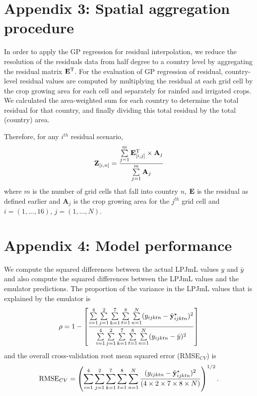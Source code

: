 \section*{Appendix 3: Spatial aggregation procedure}\label{spap}
 In order to apply the GP regression for residual interpolation, we reduce the resolution of the residuals data from half degree to a country level by aggregating the residual matrix ${\bf E}^{\rm T}$. For the evaluation of GP regression of residual, country-level residual values are computed by multiplying the residual at each grid cell by the crop growing area for each cell and separately for rainfed and irrigated crops. We calculated the area-weighted sum for each country to determine the total residual for that country, and finally dividing this total residual by the total (country) area. %

Therefore, for any $i^{th}$ residual scenario, 
\begin{equation}\label{agg1}
\mathbf{Z}_{[i,n]}=\frac{\sum \limits_{j=1}^{m} {\bf E}^{\rm T}_{[i,j]}\times \mathbf{A}_j }{\sum \limits_{j=1}^{m} \mathbf{A}_{j}}
\end{equation} 
where $m$ is the number of grid cells that fall into country $n$, ${\bf E}$ is the residual as defined earlier and $\mathbf{A}_j$ is the crop growing area for the $j^{th}$ grid cell and $i=(1,\ldots,16)$, $j=(1,\ldots,N)$. %

\section*{Appendix 4: Model performance}
We compute the squared differences between the actual LPJmL values $y$ and $\bar y$ and also compute the squared differences between the LPJmL values and the emulator predictions. The proportion of the variance in the LPJmL values that is explained by the emulator is
\begin{align}\label{gaga4}
\rho=1-\left[\frac{\sum\limits_{i=1}^{4}\sum\limits_{j=1}^{2}
\sum\limits_{k=1}^7\sum\limits_{t=1}^8\sum\limits_{n=1}^N
(y_{ijktn}-{\tilde {\bf y}}_{ijktn}^{\star})^2}
{\sum\limits_{i=1}^{4}\sum\limits_{j=1}^{2}
\sum\limits_{k=1}^7\sum\limits_{t=1}^8\sum\limits_{n=1}^N
(y_{ijktn}-\bar y)^2}\right]
\end{align}
and the overall cross-validation root mean squared error (RMSE$_{CV}$) is
\begin{equation}\label{gaga4b}
\mbox{RMSE}_{CV}= \left(
\sum\limits_{i=1}^{4}\sum\limits_{j=1}^{2}
\sum\limits_{k=1}^7\sum\limits_{t=1}^8\sum\limits_{n=1}^N
\frac{(y_{ijktn}-{\tilde {\bf y}}_{ijktn}^{\star})^2}{(4\times2\times7\times8\times N)} \right)^{1/2}.
\end{equation}


